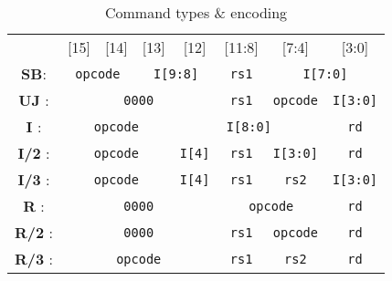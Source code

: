 \documentclass[a4paper]{article}
\begin{document}
\begin{table}[!h]
    \centering
    \caption{Command types \& encoding}
    \begin{tabular}{c c c c c c c c}
         &[15] & [14] & [13] & [12] & [11:8] & [7:4] & [3:0]\\ \cline{2-8}
         \textbf{SB}: &  \multicolumn{2}{|c|}{\texttt{opcode}} & \multicolumn{2}{c|}{\texttt{I[9:8]}} & \texttt{rs1} & \multicolumn{2}{|c|}{\texttt{I[7:0]}}\\ \cline{2-8}
         \textbf{UJ} : & \multicolumn{4}{|c|}{\texttt{0000}} & \texttt{rs1} & \multicolumn{1}{|c}{\texttt{opcode}} & \multicolumn{1}{|c|}{\texttt{I[3:0]}} \\ \cline{2-8}
         \textbf{I} : & \multicolumn{3}{|c}{\texttt{opcode}} & \multicolumn{3}{|c}{\texttt{I[8:0]}} & \multicolumn{1}{|c|}{\texttt{rd}}\\ \cline{2-8}
         \textbf{I/2} : & \multicolumn{3}{|c}{\texttt{opcode}} & \multicolumn{1}{|c}{\texttt{I[4]}} & \multicolumn{1}{|c|}{\texttt{rs1}} & \texttt{I[3:0]} & \multicolumn{1}{|c|}{\texttt{rd}}\\ \cline{2-8}
         \textbf{I/3} : & \multicolumn{3}{|c}{\texttt{opcode}} & \multicolumn{1}{|c}{\texttt{I[4]}} & \multicolumn{1}{|c|}{\texttt{rs1}} & \texttt{rs2} & \multicolumn{1}{|c|}{\texttt{I[3:0]}}\\ \cline{2-8}
         \textbf{R} : & \multicolumn{4}{|c|}{\texttt{0000}} & \multicolumn{2}{c}{\texttt{opcode}} & \multicolumn{1}{|c|}{\texttt{rd}}\\ \cline{2-8}
         \textbf{R/2} : & \multicolumn{4}{|c|}{\texttt{0000}} & \texttt{rs1} & \multicolumn{1}{|c}{\texttt{opcode}} & \multicolumn{1}{|c|}{\texttt{rd}}\\ \cline{2-8}
         \textbf{R/3} : & \multicolumn{4}{|c|}{\texttt{opcode}} & \texttt{rs1} & \multicolumn{1}{|c}{\texttt{rs2}} & \multicolumn{1}{|c|}{\texttt{rd}}  \\ \cline{2-8}
    \end{tabular}
    \label{tab:my_label}
\end{table}
\end{document}
